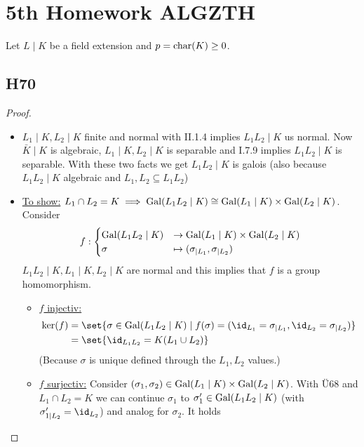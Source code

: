 
\section{5th Homework ALGZTH}
Let $L\mid K$ be a field extension and $p = \operatorname{char}(K) \ge 0$.
\subsection{H70}
\begin{proof}\
	\begin{itemize}
		\item $L_1 \mid K, L_2\mid K$ finite and normal with II.1.4 implies $L_1 L_2 \mid K$ us normal. Now $\bar{K} \mid K$ is algebraic, $L_1\mid K, L_2 \mid K$ is separable and I.7.9 implies $L_1 L_2 \mid K$ is separable. With these two facts we get $L_1 L_2 \mid K$ is galois (also because $L_1 L_2 \mid K$ algebraic and $L_1, L_2 \subseteq L_1 L_2$)
		\item \ul{To show:} $L_1\cap L_2 = K \implies \operatorname{Gal}(L_1 L_2 \mid K) \cong \operatorname{Gal}(L_1 \mid K) \times \operatorname{Gal}(L_2 \mid K)$. Consider
		\begin{align*}
			f: \begin{cases}
				\operatorname{Gal}(L_1 L_2 \mid K) &\to \operatorname{Gal}(L_1 \mid K) \times \operatorname{Gal}(L_2 \mid K)\\
				\sigma &\mapsto (\sigma_{\mid L_1}, \sigma_{\mid L_2})
			\end{cases}
		\end{align*}
		$L_1 L_2 \mid K, L_1 \mid K, L_2 \mid K$ are normal and this implies that $f$ is a group homomorphism.
		\begin{itemize}
			\item \ul{$f$ injectiv:}
			\begin{align*}
				\ker(f) &= \set{\sigma \in \Gal(L_1 L_2 \mid K) \mid f(\sigma) = (\id_{L_1} = \sigma_{\mid L_1}, \id_{L_2} = \sigma_{\mid L_2})}\\
				&=\set{\id_{L_1 L_2} = K(L_1 \cup L_2)}
			\end{align*}
			(Because $\sigma$ is unique defined through the $L_1, L_2$ values.)
			\item \ul{$f$ surjectiv:} Consider $(\sigma_1 , \sigma_2) \in \operatorname{Gal}(L_1 \mid K) \times \operatorname{Gal}(L_2 \mid K)$. With Ü68 and $L_1 \cap L_2 = K$ we can continue $\sigma_1$ to $\sigma'_1 \in \operatorname{Gal}(L_1 L_2 \mid K)$ (with $\sigma'_{1\mid L_2} = \id_{L_2}$) and analog for $\sigma_2$. It holds

\end{itemize}
\end{itemize}
\end{proof}
